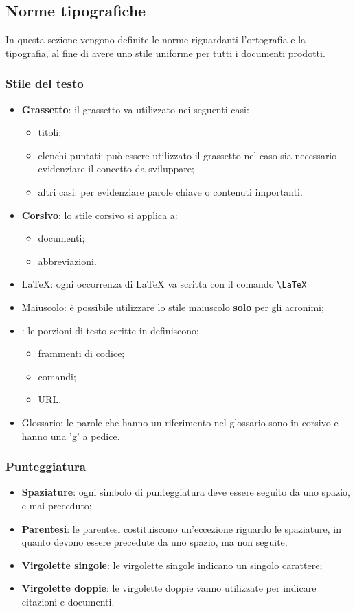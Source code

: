 	\subsection{Norme tipografiche}
	In questa sezione vengono definite le norme riguardanti l'ortografia e la tipografia, al fine di avere uno stile uniforme per tutti i documenti prodotti.
		\subsubsection{Stile del testo}
		\begin{itemize}
			\item \textbf{Grassetto}: il grassetto va utilizzato nei seguenti casi:
			\begin{itemize}
				\item titoli;
				\item elenchi puntati: può essere utilizzato il grassetto nel caso sia necessario evidenziare il concetto da sviluppare;
				\item altri casi: per evidenziare parole chiave o contenuti importanti.
			\end{itemize}
			\item \textbf{Corsivo}: lo stile corsivo si applica a:
				\begin{itemize}
					\item documenti;
					\item abbreviazioni.
				\end{itemize}
			\item \LaTeX: ogni occorrenza di \LaTeX{} va scritta con il comando \texttt{\textbackslash LaTeX}
			\item Maiuscolo: è possibile utilizzare lo stile maiuscolo \textbf{solo} per gli acronimi;
			\item {}: le porzioni di testo scritte in  definiscono:
			\begin{itemize}
				\item frammenti di codice;
				\item comandi;
				\item URL.
			\end{itemize} 
			\item Glossario: le parole che hanno un riferimento nel glossario sono in corsivo e hanno una 'g' a pedice.
		\end{itemize}
		\subsubsection{Punteggiatura}
		\begin{itemize}
			\item \textbf{Spaziature}: ogni simbolo di punteggiatura deve essere seguito da uno spazio, e mai preceduto;
			\item \textbf{Parentesi}: le parentesi costituiscono un'eccezione riguardo le spaziature, in quanto devono essere precedute da uno spazio, ma non seguite;
			\item \textbf{Virgolette singole}: le virgolette singole indicano un singolo carattere;
			\item \textbf{Virgolette doppie}: le virgolette doppie vanno utilizzate per indicare citazioni e documenti.
		\end{itemize}
